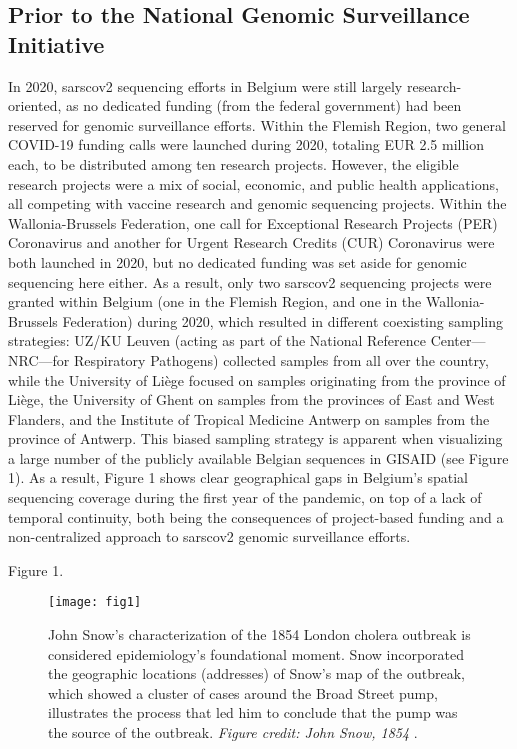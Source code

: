 \subsection{Prior to the National Genomic Surveillance Initiative}
In 2020, \gls{sarscov2} sequencing efforts in Belgium were still largely research-oriented, as no dedicated funding (from the federal government) had been reserved for genomic surveillance efforts.
Within the Flemish Region, two general COVID-19 funding calls were launched during 2020, totaling EUR 2.5 million each, to be distributed among ten research projects.
However, the eligible research projects were a mix of social, economic, and public health applications, all competing with vaccine research and genomic sequencing projects.
Within the Wallonia-Brussels Federation, one call for Exceptional Research Projects (PER) Coronavirus and another for Urgent Research Credits (CUR) Coronavirus were both launched in 2020, but no dedicated funding was set aside for genomic sequencing here either.
As a result, only two \gls{sarscov2} sequencing projects were granted within Belgium (one in the Flemish Region, and one in the Wallonia-Brussels Federation) during 2020, which resulted in different coexisting sampling strategies: UZ/KU Leuven (acting as part of the National Reference Center—NRC—for Respiratory Pathogens) collected samples from all over the country, while the University of Li\`{e}ge focused on samples originating from the province of Li\`{e}ge, the University of Ghent on samples from the provinces of East and West Flanders, and the Institute of Tropical Medicine Antwerp on samples from the province of Antwerp.
This biased sampling strategy is apparent when visualizing a large number of the publicly available Belgian sequences in GISAID (see Figure 1).
As a result, Figure 1 shows clear geographical gaps in Belgium's spatial sequencing coverage during the first year of the pandemic, on top of a lack of temporal continuity, both being the consequences of project-based funding and a non-centralized approach to \gls{sarscov2} genomic surveillance efforts.


Figure 1. 
\begin{figure}[ht]
  \centering
  \texttt{[image: fig1]}
  \caption[John Snow's map of the 1854 Broad Street cholera outbreak in London]{John Snow's characterization of the 1854 London cholera outbreak is considered epidemiology's foundational moment. Snow incorporated the geographic locations (addresses) of Snow's map of the outbreak, which showed a cluster of cases around the Broad Street pump, illustrates the process that led him to conclude that the pump was the source of the outbreak. \textit{Figure credit: John Snow, 1854} \citep{snow1854mode}.}
  \label{fig:broadStreetPump}
\end{figure}

